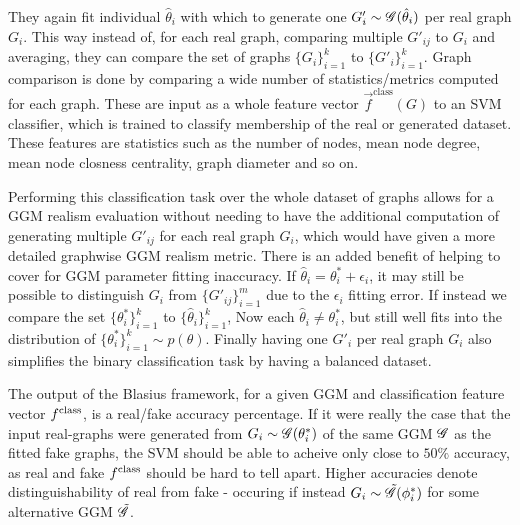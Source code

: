 They again fit individual $\hat{\theta}_i$ with which to generate one $G'_i \sim \mathscr{G}(\hat{\theta}_i)$ per real graph $G_i$. This way instead of, for each real graph, comparing multiple $G'_{ij}$ to $G_i$ and averaging, they can compare the set of graphs $\{G_i\}_{i=1}^k$ to $\{G'_i\}_{i=1}^k$. Graph comparison is done by comparing a wide number of statistics/metrics computed for each graph. These are input as a whole feature vector $\vec{f}^\mathrm{class}(G)$ to an SVM classifier, which is trained to classify membership of the real or generated dataset. These features are statistics such as the number of nodes, mean node degree, mean node closness centrality, graph diameter and so on.


Performing this classification task over the whole dataset of graphs allows for a GGM realism evaluation without needing to have the additional computation of generating multiple $G'_{ij}$ for each real graph $G_i$, which would have given a more detailed graphwise GGM realism metric. There is an added benefit of helping to cover for GGM parameter fitting inaccuracy. If $\hat{\theta}_i = \theta^*_i + \epsilon_i$, it may still be possible to distinguish $G_i$ from $\{G'_{ij}\}_{i=1}^m$ due to the $\epsilon_i$ fitting error. If instead we compare the set $\{\theta^*_i\}_{i=1}^k$ to $\{\hat{\theta}_i\}_{i=1}^k$, Now each $\hat{\theta}_i \neq \theta^*_i$, but still well fits into the distribution of $\{\theta^*_i\}_{i=1}^k \sim p(\theta)$. Finally having one $G'_i$ per real graph $G_i$ also simplifies the binary classification task by having a balanced dataset.



The output of the Blasius framework, for a given GGM and classification feature vector $f^{\mathrm{class}}$, is a real/fake accuracy percentage. If it were really the case that the input real-graphs were generated from $G_i \sim \mathscr{G}(\theta^*_i)$ of the same GGM $\mathscr{G}$ as the fitted fake graphs, the SVM should be able to acheive only close to $50\%$ accuracy, as real and fake $f^{\mathrm{class}}$ should be hard to tell apart. Higher accuracies denote distinguishability of real from fake - occuring if instead $G_i \sim \tilde{\mathscr{G}}(\phi^*_i)$ for some alternative GGM $\tilde{\mathscr{G}}$.


